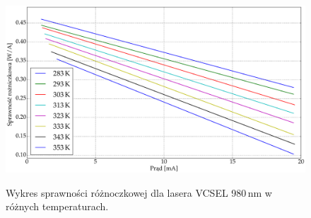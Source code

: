 \begin{figure}
\center
  \includegraphics[scale=0.30]{plot980/plot_eff_via_current_all.eps}
  \label{rys1}
  \caption{Wykres sprawności różnoczkowej dla lasera VCSEL 980\,nm w różnych temperaturach.}
\end{figure}